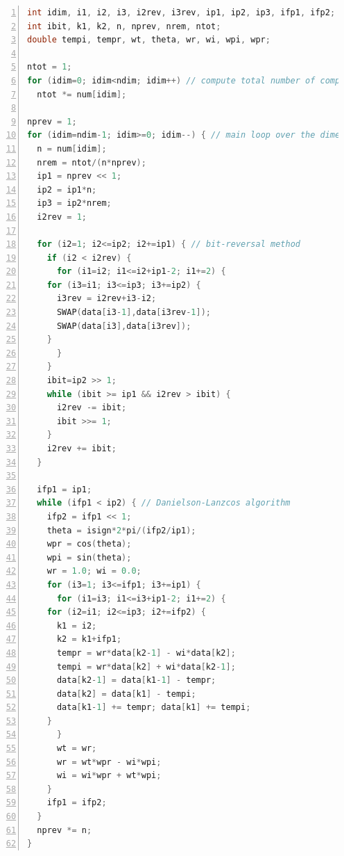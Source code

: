 \addvspace{12pt}

\begin{lstlisting}[language=C++,
    caption={multidimensional FFT algorithm in C},
    numbers=left,
    basicstyle=\small,
    frame=single,
    fontadjust]
int idim, i1, i2, i3, i2rev, i3rev, ip1, ip2, ip3, ifp1, ifp2;
int ibit, k1, k2, n, nprev, nrem, ntot;
double tempi, tempr, wt, theta, wr, wi, wpi, wpr;

ntot = 1;
for (idim=0; idim<ndim; idim++) // compute total number of complex values
  ntot *= num[idim];

nprev = 1;
for (idim=ndim-1; idim>=0; idim--) { // main loop over the dimensions
  n = num[idim];
  nrem = ntot/(n*nprev);
  ip1 = nprev << 1;
  ip2 = ip1*n;
  ip3 = ip2*nrem;
  i2rev = 1;

  for (i2=1; i2<=ip2; i2+=ip1) { // bit-reversal method
    if (i2 < i2rev) {
      for (i1=i2; i1<=i2+ip1-2; i1+=2) {
	for (i3=i1; i3<=ip3; i3+=ip2) {
	  i3rev = i2rev+i3-i2;
	  SWAP(data[i3-1],data[i3rev-1]);
	  SWAP(data[i3],data[i3rev]);
	}
      }
    }
    ibit=ip2 >> 1;
    while (ibit >= ip1 && i2rev > ibit) {
      i2rev -= ibit;
      ibit >>= 1;
    }
    i2rev += ibit;
  }

  ifp1 = ip1;
  while (ifp1 < ip2) { // Danielson-Lanzcos algorithm
    ifp2 = ifp1 << 1;
    theta = isign*2*pi/(ifp2/ip1);
    wpr = cos(theta);
    wpi = sin(theta);
    wr = 1.0; wi = 0.0;
    for (i3=1; i3<=ifp1; i3+=ip1) {
      for (i1=i3; i1<=i3+ip1-2; i1+=2) {
	for (i2=i1; i2<=ip3; i2+=ifp2) {
	  k1 = i2;
	  k2 = k1+ifp1;
	  tempr = wr*data[k2-1] - wi*data[k2];
	  tempi = wr*data[k2] + wi*data[k2-1];
	  data[k2-1] = data[k1-1] - tempr;
	  data[k2] = data[k1] - tempi;
	  data[k1-1] += tempr; data[k1] += tempi;
	}
      }
      wt = wr;
      wr = wt*wpr - wi*wpi;
      wi = wi*wpr + wt*wpi;
    }
    ifp1 = ifp2;
  }
  nprev *= n;
}
\end{lstlisting}

